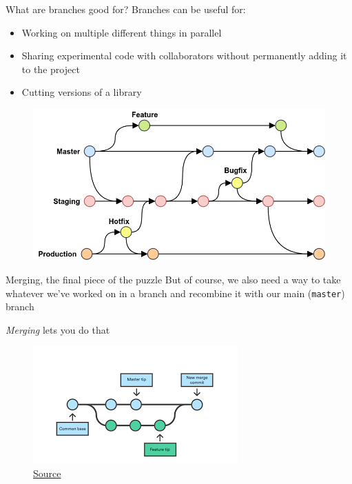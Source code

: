 \documentclass[pdf]{beamer} %
\begin{document}
\begin{frame}[t]{What are branches good for?}
    Branches can be useful for:
    \begin{itemize}
        \item Working on multiple different things in parallel
        \item Sharing experimental code with collaborators without permanently adding it to the project
        \item Cutting versions of a library
    \end{itemize}

    \begin{figure}[htpb]
        \centering
        \includegraphics[width=0.8\linewidth]{fig/git-branch-complex}
        \label{fig:fig/git-branch-complex}
    \end{figure}
    
\end{frame}

\begin{frame}[t]{Merging, the final piece of the puzzle}
    But of course, we also need a way to take whatever we've worked on in a branch and recombine it with our main (\texttt{master}) branch

    \bigskip
    \emph{Merging} lets you do that


    \begin{figure}[htpb]
        \centering
        \includegraphics[width=0.8\linewidth]{fig/git-merge.png}
        \caption{\href{https://www.atlassian.com/git/tutorials/using-branches/git-merge}{Source}}
        \label{fig:fig/git-merge}
    \end{figure}
    
\end{frame}
\end{document}
